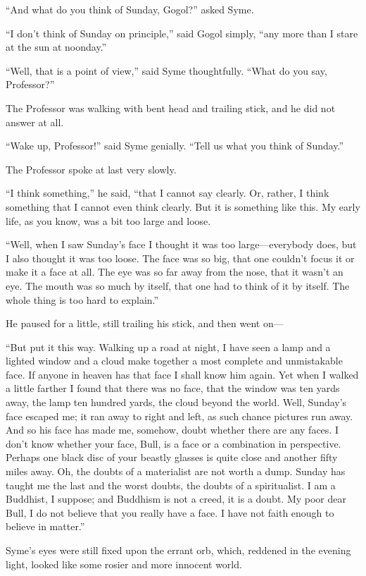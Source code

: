 “And what do you think of Sunday, Gogol?” asked Syme.

“I don’t think of Sunday on principle,” said Gogol simply, “any more than I stare at the sun at noonday.”

“Well, that is a point of view,” said Syme thoughtfully. “What do you say, Professor?”

The Professor was walking with bent head and trailing stick, and he did not answer at all.

“Wake up, Professor!” said Syme genially. “Tell us what you think of Sunday.”

The Professor spoke at last very slowly.

“I think something,” he said, “that I cannot say clearly. Or, rather, I think something that I cannot even think clearly. But it is something like this. My early life, as you know, was a bit too large and loose.

“Well, when I saw Sunday’s face I thought it was too large⁠—everybody does, but I also thought it was too loose. The face was so big, that one couldn’t focus it or make it a face at all. The eye was so far away from the nose, that it wasn’t an eye. The mouth was so much by itself, that one had to think of it by itself. The whole thing is too hard to explain.”

He paused for a little, still trailing his stick, and then went on⁠—

“But put it this way. Walking up a road at night, I have seen a lamp and a lighted window and a cloud make together a most complete and unmistakable face. If anyone in heaven has that face I shall know him again. Yet when I walked a little farther I found that there was no face, that the window was ten yards away, the lamp ten hundred yards, the cloud beyond the world. Well, Sunday’s face escaped me; it ran away to right and left, as such chance pictures run away. And so his face has made me, somehow, doubt whether there are any faces. I don’t know whether your face, Bull, is a face or a combination in perspective. Perhaps one black disc of your beastly glasses is quite close and another fifty miles away. Oh, the doubts of a materialist are not worth a dump. Sunday has taught me the last and the worst doubts, the doubts of a spiritualist. I am a Buddhist, I suppose; and Buddhism is not a creed, it is a doubt. My poor dear Bull, I do not believe that you really have a face. I have not faith enough to believe in matter.”

Syme’s eyes were still fixed upon the errant orb, which, reddened in the evening light, looked like some rosier and more innocent world.


